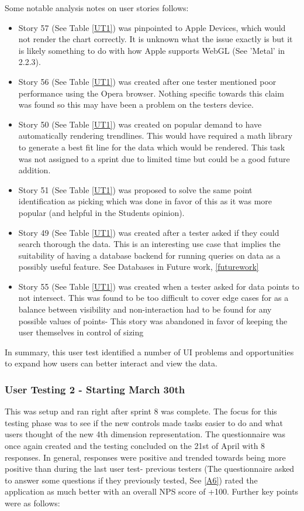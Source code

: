 Some notable analysis notes on user stories follows:

\begin{itemize}
    \item Story 57 (See Table \ref{UT1}) was pinpointed to Apple Devices, which would not render the chart correctly. It is unknown what the issue exactly is but it is likely something to do with how Apple supports WebGL \cite{khronosgroup_2022_webgl} (See 'Metal' in 2.2.3).
    \item Story 56 (See Table \ref{UT1}) was created after one tester mentioned poor performance using the Opera browser. Nothing specific towards this claim was found so this may have been a problem on the testers device.
    \item Story 50 (See Table \ref{UT1}) was created on popular demand to have automatically rendering trendlines. This would have required a math library to generate a best fit line for the data which would be rendered. This task was not assigned to a sprint due to limited time but could be a good future addition.
    \item Story 51 (See Table \ref{UT1}) was proposed to solve the same point identification as picking which was done in favor of this as it was more popular (and helpful in the Students opinion).
    \item Story 49 (See Table \ref{UT1}) was created after a tester asked if they could search thorough the data. This is an interesting use case that implies the suitability of having a database backend for running queries on data as a possibly useful feature. See Databases in Future work, \ref{futurework}
    \item Story 55 (See Table \ref{UT1}) was created when a tester asked for data points to not intersect. This was found to be too difficult to cover edge cases for as a balance between visibility and non-interaction had to be found for any possible values of points- This story was abandoned in favor of keeping the user themselves in control of sizing
\end{itemize}

In summary, this user test identified a number of UI problems and opportunities to expand how users can better interact and view the data.

\subsubsection{User Testing 2 - Starting March 30th}
This was setup and ran right after sprint 8 was complete. The focus for this testing phase was to see if the new controls made tasks easier to do and what users thought of the new 4th dimension representation. The questionnaire was once again created and the testing concluded on the 21st of April with 8 responses. In general, responses were positive and trended towards being more positive than during the last user test- previous testers (The questionnaire asked to answer some questions if they previously tested, See \ref{A6}) rated the application as much better with an overall NPS score of +100. Further key points were as follows:

